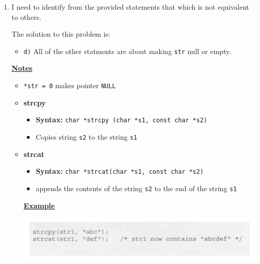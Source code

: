 \documentclass[12pt]{article}
\begin{document}
\begin{enumerate}[1.]
\begin{mdframed}
\begin{lstlisting}[language=c]
        }
        \end{lstlisting}

    \end{mdframed}

    \item

    I need to identify from the provided statements that which is not equivalent to others.

    \bigskip

    The solution to this problem is:

    \begin{itemize}
        \item \texttt{d)} All of the other statments are about making \texttt{str} null or empty.
    \end{itemize}

    \bigskip

    \underline{\textbf{Notes}}

    \begin{itemize}
        \item \texttt{*str = 0} makes pointer \texttt{NULL}
        \item \textbf{strcpy}

        \begin{itemize}
            \item \textbf{Syntax:} \texttt{char *strcpy (char *s1, const char *s2)}
            \item Copies string \texttt{s2} to the string \texttt{s1}
        \end{itemize}

        \item \textbf{strcat}

        \begin{itemize}
            \item \textbf{Syntax:} \texttt{char *strcat(char *s1, const char *s2)}
            \item appends the contents of the string \texttt{s2} to the end of the string \texttt{s1}
        \end{itemize}

        \bigskip

        \underline{\textbf{Example}}

        \bigskip

        \begin{center}
        \includegraphics[width=0.8\linewidth]{images/review_6_solution_4.png}
        \end{center}
    \end{itemize}


\end{enumerate}
\end{document}
